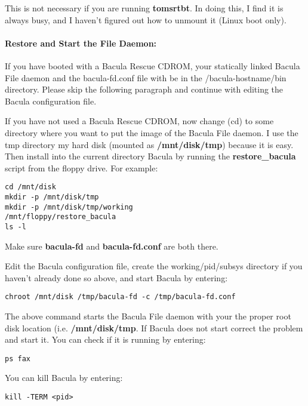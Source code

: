 This is not necessary if you are running {\bf tomsrtbt}. In doing this, I find
it is always busy, and I haven't figured out how to unmount it (Linux boot
only). 

\paragraph*{Restore and Start the File Daemon:}

If you have booted with a Bacula Rescue CDROM, your statically linked Bacula
File daemon and the bacula-fd.conf file with be in the /bacula-hostname/bin
directory. Please skip the following paragraph and continue with editing the
Bacula configuration file. 

If you have not used a Bacula Rescue CDROM, now change (cd) to some directory
where you want to put the image of the Bacula File daemon. I use the tmp
directory my hard disk (mounted as {\bf /mnt/disk/tmp}) because it is easy.
Then install into the current directory Bacula by running the {\bf
restore\_bacula} script from the floppy drive. For example: 

\footnotesize
\begin{verbatim}
cd /mnt/disk
mkdir -p /mnt/disk/tmp
mkdir -p /mnt/disk/tmp/working
/mnt/floppy/restore_bacula
ls -l
\end{verbatim}
\normalsize

Make sure {\bf bacula-fd} and {\bf bacula-fd.conf} are both there. 

Edit the Bacula configuration file, create the working/pid/subsys directory if
you haven't already done so above, and start Bacula by entering: 

\footnotesize
\begin{verbatim}
chroot /mnt/disk /tmp/bacula-fd -c /tmp/bacula-fd.conf
\end{verbatim}
\normalsize

The above command starts the Bacula File daemon with your the proper root disk
location (i.e. {\bf /mnt/disk/tmp}. If Bacula does not start correct the
problem and start it. You can check if it is running by entering: 

\footnotesize
\begin{verbatim}
ps fax
\end{verbatim}
\normalsize

You can kill Bacula by entering: 

\footnotesize
\begin{verbatim}
kill -TERM <pid>
\end{verbatim}
\normalsize

